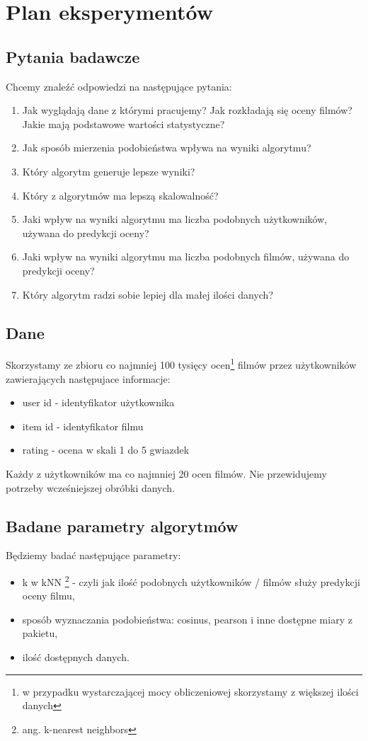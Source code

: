 \documentclass[12pt, a4paper]{article}
\begin{document}
\section{Plan eksperymentów}

\subsection{Pytania badawcze}
Chcemy znaleźć odpowiedzi na następujące pytania:

\begin{enumerate}
\item Jak wyglądają dane z którymi pracujemy? Jak rozkładają się oceny filmów? Jakie mają podstawowe wartości statystyczne?
\item Jak sposób mierzenia podobieństwa wpływa na wyniki algorytmu?
\item Który algorytm generuje lepsze wyniki?
\item Który z algorytmów ma lepszą skalowalność?
\item Jaki wpływ na wyniki algorytmu ma liczba podobnych użytkowników, używana do predykcji oceny?
\item Jaki wpływ na wyniki algorytmu ma liczba podobnych filmów, używana do predykcji oceny?
\item Który algorytm radzi sobie lepiej dla małej ilości danych?
\end{enumerate}

\subsection{Dane}
Skorzystamy ze zbioru co najmniej 100 tysięcy ocen\footnote{w przypadku wystarczającej mocy
obliczeniowej skorzystamy z większej ilości danych} filmów przez użytkowników zawierających
następujace informacje:

\begin{itemize}
\item user id - identyfikator użytkownika
\item item id - identyfikator filmu
\item rating - ocena w skali 1 do 5 gwiazdek
\end{itemize}

Każdy z użytkowników ma co najmniej 20 ocen filmów. Nie przewidujemy potrzeby wcześniejszej obróbki danych.

\subsection{Badane parametry algorytmów}
Będziemy badać następujące parametry:
\begin{itemize}
\item k w kNN \footnote{ang. k-nearest neighbors} - czyli jak ilość podobnych użytkowników / filmów służy predykcji oceny filmu,
\item sposób wyznaczania podobieństwa: cosinus, pearson i inne dostępne miary z pakietu,
\item ilość dostępnych danych.
\end{itemize}
\end{document}
